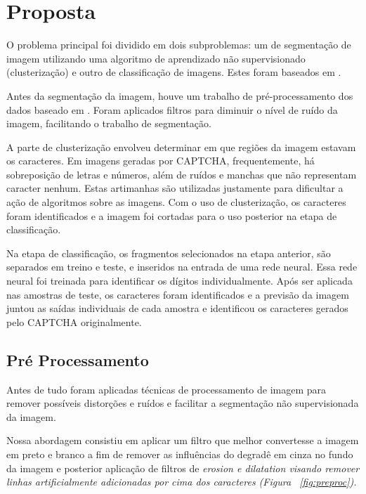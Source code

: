 \documentclass[11pt]{article}
\begin{document}
  \section{Proposta}
  \label{sec:detalhes}

  O problema principal foi dividido em dois subproblemas: um de segmentação de imagem utilizando uma algoritmo de aprendizado não supervisionado (clusterização) e outro de classificação de imagens. Estes foram baseados em \cite{kopp2017}.

Antes da segmentação da imagem, houve um trabalho de pré-processamento dos dados baseado em \cite{proc}. Foram aplicados filtros para diminuir o nível de ruído da imagem, facilitando o trabalho de segmentação. 

A parte de clusterização envolveu determinar em que regiões da imagem estavam os caracteres. Em imagens geradas por CAPTCHA, frequentemente, há sobreposição de letras e números, além de ruídos e manchas que não representam caracter nenhum. Estas artimanhas são utilizadas justamente para dificultar a ação de algoritmos sobre as imagens. Com o uso de clusterização, os caracteres foram identificados e a imagem foi cortadas para o uso posterior na etapa de classificação. 

Na etapa de classificação, os fragmentos selecionados na etapa anterior, são separados em treino e teste, e inseridos na entrada de uma rede neural. Essa rede neural foi treinada para identificar os dígitos individualmente. Após ser aplicada nas amostras de teste, os caracteres foram identificados e a previsão da imagem juntou as saídas individuais de cada amostra e identificou os caracteres gerados pelo CAPTCHA originalmente.



\subsection{Pré Processamento}
\label{sec:preprocessing}

Antes de tudo foram aplicadas técnicas de processamento de imagem para remover possíveis distorções e ruídos e facilitar a segmentação não supervisionada da imagem.

Nossa abordagem consistiu em aplicar um filtro que melhor convertesse a imagem em preto e branco a fim de remover as influências do degradê em cinza no fundo da imagem e posterior aplicação de filtros de \em erosion \em e \em dilatation \em visando remover linhas artificialmente adicionadas por cima dos caracteres (Figura ~\ref{fig:preproc}).
\end{document}
